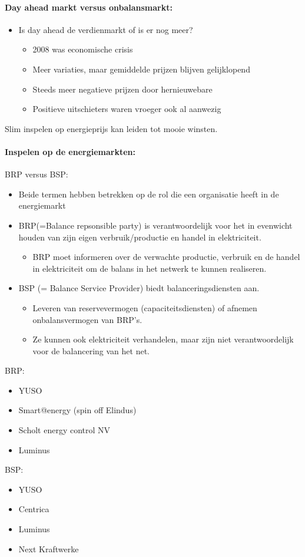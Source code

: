 \documentclass[12pt]{article}
\begin{document}
\paragraph{Day ahead markt versus onbalansmarkt:}\begin{itemize}
    \item Is day ahead de verdienmarkt of is er nog meer?\begin{itemize}
        \item 2008 was economische crisis 
        \item Meer variaties, maar gemiddelde prijzen blijven gelijklopend 
        \item Steeds meer negatieve prijzen door hernieuwebare 
        \item Positieve uitschieters waren vroeger ook al aanwezig
    \end{itemize}
\end{itemize}
Slim inspelen op energieprijs kan leiden tot mooie winsten.
\paragraph{Inspelen op de energiemarkten:}
BRP versus BSP:\begin{itemize}
    \item Beide termen hebben betrekken op de rol die een organisatie heeft in de energiemarkt
    \item BRP(=Balance repsonsible party) is verantwoordelijk voor het in evenwicht houden van zijn eigen verbruik/productie en handel in elektriciteit.\begin{itemize}
        \item BRP moet informeren over de verwachte productie, verbruik en de handel in elektriciteit om de balans in het netwerk te kunnen realiseren.
    \end{itemize}
    \item BSP (= Balance Service Provider) biedt balanceringsdiensten aan.\begin{itemize}
        \item Leveren van reservevermogen (capaciteitsdiensten) of afnemen onbalansvermogen van BRP's.
        \item Ze kunnen ook elektriciteit verhandelen, maar zijn niet verantwoordelijk voor de balancering van het net.
    \end{itemize}
\end{itemize}
BRP:\begin{itemize}
    \item YUSO
    \item Smart@energy (spin off Elindus)
    \item Scholt energy control NV
    \item Luminus
\end{itemize}
BSP:\begin{itemize}
    \item YUSO 
    \item Centrica 
    \item Luminus 
    \item Next Kraftwerke
\end{itemize}
\end{document}
